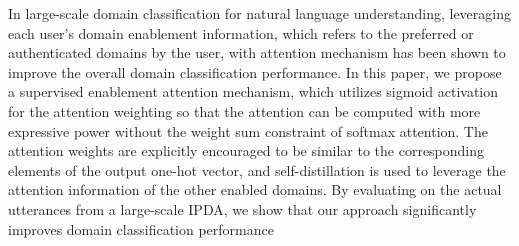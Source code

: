 In large-scale domain classification for natural language understanding, leveraging each user's domain enablement information, which refers to the preferred or authenticated domains by the user, with attention mechanism has been shown to improve the overall domain classification performance. In this paper, we propose a supervised enablement attention mechanism, which utilizes sigmoid activation for the attention weighting so that the attention can be computed with more expressive power without the weight sum constraint of softmax attention. The attention weights are explicitly encouraged to be similar to the corresponding elements of the output one-hot vector, and self-distillation is used to leverage the attention information of the other enabled domains. By evaluating on the actual utterances from a large-scale IPDA, we show that our approach significantly improves domain classification performance
